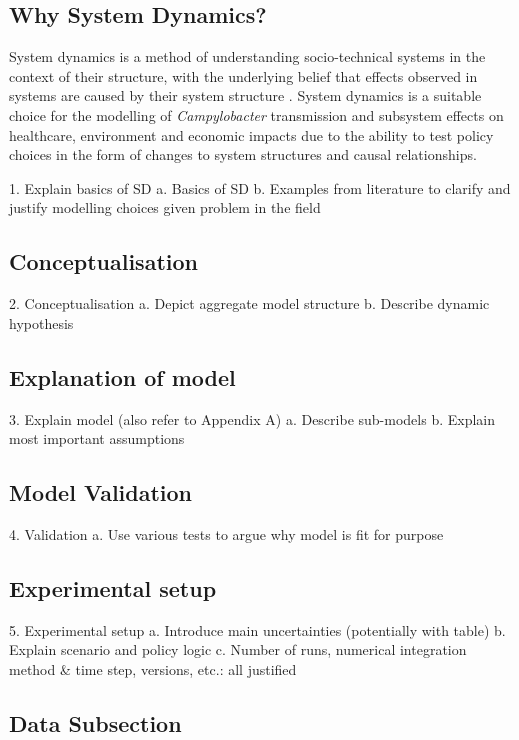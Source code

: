 
\subsection{Why System Dynamics?}
System dynamics is a method of understanding socio-technical systems in the context of their structure, with the underlying belief that effects observed in systems are caused by their system structure \parencite{pruyt_triple_2013}. System dynamics is a suitable choice for the modelling of \textit{Campylobacter} transmission and subsystem effects on healthcare, environment and economic impacts due to the ability to test policy choices in the form of changes to system structures and causal relationships.

1.	Explain basics of SD
    a.	Basics of SD
    b.	Examples from literature to clarify and justify modelling choices given problem in the field
    
\subsection{Conceptualisation}
2.	Conceptualisation
    a.	Depict aggregate model structure
    b.	Describe dynamic hypothesis
    
\subsection{Explanation of model}
3.	Explain model (also refer to Appendix A)
    a.	Describe sub-models
    b.	Explain most important assumptions
    
\subsection{Model Validation}
4.	Validation
    a.	Use various tests to argue why model is fit for purpose
    
\subsection{Experimental setup}
5.	Experimental setup
    a.	Introduce main uncertainties (potentially with table)
    b.	Explain scenario and policy logic
    c.	Number of runs, numerical integration method & time step, versions, etc.: all justified

\subsection{Data Subsection}
\blindtext

